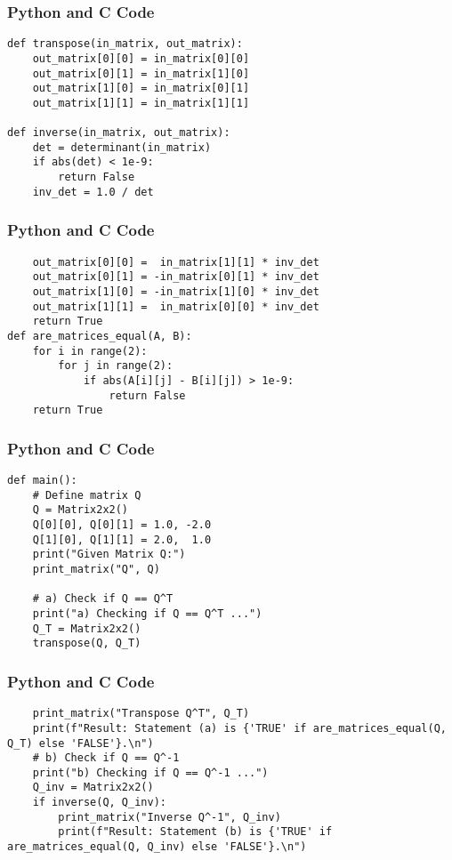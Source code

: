 \documentclass{beamer}
\begin{document}
\begin{frame}[fragile]
\frametitle{Python and C Code}
\begin{lstlisting}
def transpose(in_matrix, out_matrix):
    out_matrix[0][0] = in_matrix[0][0]
    out_matrix[0][1] = in_matrix[1][0]
    out_matrix[1][0] = in_matrix[0][1]
    out_matrix[1][1] = in_matrix[1][1]

def inverse(in_matrix, out_matrix):
    det = determinant(in_matrix)
    if abs(det) < 1e-9:
        return False
    inv_det = 1.0 / det
\end{lstlisting}
\end{frame}

\begin{frame}[fragile]
\frametitle{Python and C Code}
\begin{lstlisting}
    out_matrix[0][0] =  in_matrix[1][1] * inv_det
    out_matrix[0][1] = -in_matrix[0][1] * inv_det
    out_matrix[1][0] = -in_matrix[1][0] * inv_det
    out_matrix[1][1] =  in_matrix[0][0] * inv_det
    return True
def are_matrices_equal(A, B):
    for i in range(2):
        for j in range(2):
            if abs(A[i][j] - B[i][j]) > 1e-9:
                return False
    return True
\end{lstlisting}
\end{frame}

\begin{frame}[fragile]
\frametitle{Python and C Code}
\begin{lstlisting}
def main():
    # Define matrix Q
    Q = Matrix2x2()
    Q[0][0], Q[0][1] = 1.0, -2.0
    Q[1][0], Q[1][1] = 2.0,  1.0
    print("Given Matrix Q:")
    print_matrix("Q", Q)

    # a) Check if Q == Q^T
    print("a) Checking if Q == Q^T ...")
    Q_T = Matrix2x2()
    transpose(Q, Q_T)
\end{lstlisting}
\end{frame}

\begin{frame}[fragile]
\frametitle{Python and C Code}
\begin{lstlisting}
    print_matrix("Transpose Q^T", Q_T)
    print(f"Result: Statement (a) is {'TRUE' if are_matrices_equal(Q, Q_T) else 'FALSE'}.\n")
    # b) Check if Q == Q^-1
    print("b) Checking if Q == Q^-1 ...")
    Q_inv = Matrix2x2()
    if inverse(Q, Q_inv):
        print_matrix("Inverse Q^-1", Q_inv)
        print(f"Result: Statement (b) is {'TRUE' if are_matrices_equal(Q, Q_inv) else 'FALSE'}.\n")
\end{lstlisting}
\end{frame}
\end{document}
